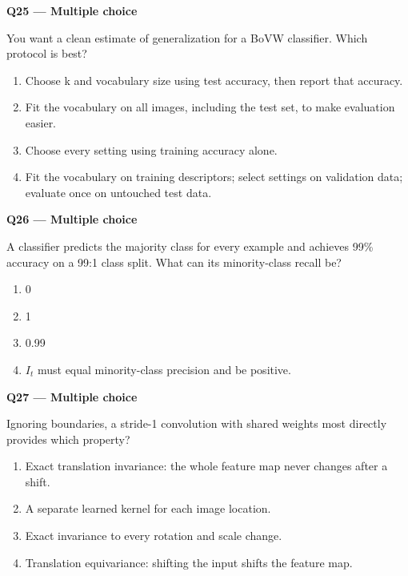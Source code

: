 \documentclass[11pt,a4paper]{article}
\begin{document}
\par\vspace{12pt}
\begin{minipage}{\linewidth}
\textbf{Q25 — Multiple choice}\par\smallskip
You want a clean estimate of generalization for a BoVW classifier. Which protocol is best?
\begin{enumerate}[label=\textbf{\Alph*.}]
\item Choose k and vocabulary size using test accuracy,\allowbreak{} then report that accuracy.
\item Fit the vocabulary on all images,\allowbreak{} including the test set,\allowbreak{} to make evaluation easier.
\item Choose every setting using training accuracy alone.
\item Fit the vocabulary on training descriptors; select settings on validation data; evaluate once on untouched test data.
\end{enumerate}
\end{minipage}
\par\vspace{12pt}
\begin{minipage}{\linewidth}
\textbf{Q26 — Multiple choice}\par\smallskip
A classifier predicts the majority class for every example and achieves 99\% accuracy on a 99:1 class split. What can its minority-class recall be?
\begin{enumerate}[label=\textbf{\Alph*.}]
\item 0
\item 1
\item 0.99
\item \(I_t\) must equal minority-class precision and be positive.
\end{enumerate}
\end{minipage}
\par\vspace{12pt}
\begin{minipage}{\linewidth}
\textbf{Q27 — Multiple choice}\par\smallskip
Ignoring boundaries,\allowbreak{} a stride-1 convolution with shared weights most directly provides which property?
\begin{enumerate}[label=\textbf{\Alph*.}]
\item Exact translation invariance: the whole feature map never changes after a shift.
\item A separate learned kernel for each image location.
\item Exact invariance to every rotation and scale change.
\item Translation equivariance: shifting the input shifts the feature map.
\end{enumerate}
\end{minipage}
\end{document}
